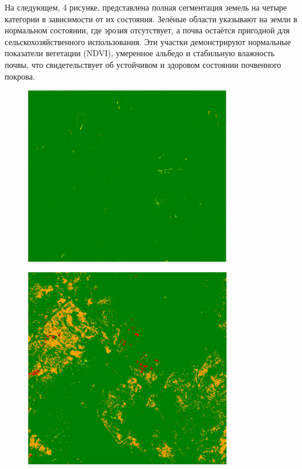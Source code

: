 На следующем, 4 рисунке, представлена полная сегментация земель на
четыре категории в зависимости от их состояния. Зелёные области
указывают на земли в нормальном состоянии, где эрозия отсутствует, а
почва остаётся пригодной для сельскохозяйственного использования. Эти
участки демонстрируют нормальные показатели вегетации (NDVI), умеренное
альбедо и стабильную влажность почвы, что свидетельствует об устойчивом
и здоровом состоянии почвенного покрова.


\begin{figure}[H]
	\centering
	\includegraphics[width=0.8\textwidth]{media/ict/image37}
	\caption*{}
\end{figure}


\begin{figure}[H]
	\centering
	\includegraphics[width=0.8\textwidth]{media/ict/image38}
	\caption*{}
\end{figure}



